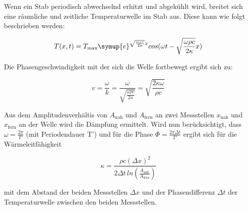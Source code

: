       \noindent Wenn ein Stab periodisch abwechselnd erhitzt und abgekühlt wird, breitet sich eine räumliche und zeitliche Temperaturwelle im Stab aus. 
      Diese kann wie folgt beschrieben werden: 

      \begin{equation*}
      T(x,t) = T_\text{max} \symup{e}^{\sqrt{\frac{\omega \rho c}{2 \kappa}}x} cos(\omega t - \sqrt{\frac{\omega \rho c}{2 \kappa}} x)
        \label{eqn:temperaturwelle}
      \end{equation*}  

      \noindent Die Phasengeschwindigkeit mit der sich die Welle fortbewegt ergibt sich zu:

      \begin{equation}
      v = \frac{\omega}{k} = \frac{\omega}{\sqrt{\frac{\omega \rho c}{2 \kappa}}} = \sqrt{\frac{2 \kappa \omega}{\rho c}}
        \label{eqn:phasengeschwindigkeit}
      \end{equation}

      \noindent Aus dem Amplitudenverhältis von $A_\text{nah}$ und $A_\text{fern}$ an zwei Messstellen $x_\text{nah}$ und $x_\text{fern}$ an der Welle wird die Dämpfung ermittelt.
      Wird nun berücksichtigt, dass $\omega = \frac{2 \pi}{T'}$ (mit Periodendauer T') und für die Phase $\Phi = \frac{2 \pi \Delta t}{T'}$ ergibt sich für die Wärmeleitfähigkeit

      \begin{equation}
      \kappa = \frac{\rho c (\Delta x)^2}{2 \Delta t \, ln (\frac{A_\text{nah}}{A_\text{fern}})}
        \label{eqn:waermeleitfaehigkeit}
      \end{equation}

     \noindent mit dem Abstand der beiden Messstellen $\Delta x$ und der Phasendifferenz $\Delta t$ der Temperaturwelle zwischen den beiden Messstellen.